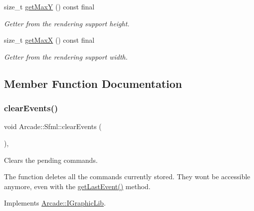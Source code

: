 \begin{DoxyCompactItemize}
size\+\_\+t \hyperlink{class_arcade_1_1_sfml_a90cb12cc852a0198074f55be843d6f99}{get\+MaxY} () const final
\begin{DoxyCompactList}\small\item\em Getter from the rendering support height. \end{DoxyCompactList}\item 
size\+\_\+t \hyperlink{class_arcade_1_1_sfml_a220fc84bb5728f79e36024fded0103ab}{get\+MaxX} () const final
\begin{DoxyCompactList}\small\item\em Getter from the rendering support width. \end{DoxyCompactList}\end{DoxyCompactItemize}


\subsection{Member Function Documentation}
\mbox{\label{class_arcade_1_1_sfml_a882877eba4037ffe3befd61a4b4f1d18}} 
\subsubsection{\texorpdfstring{clear\+Events()}{clearEvents()}}
{\footnotesize\ttfamily void Arcade\+::\+Sfml\+::clear\+Events (\begin{DoxyParamCaption}{ }\end{DoxyParamCaption})\hspace{0.3cm}{\ttfamily [final]}, {\ttfamily [virtual]}}



Clears the pending commands. 

The function deletes all the commands currently stored. They wont be accessible anymore, even with the \hyperlink{class_arcade_1_1_sfml_aa31ab4c4729ee0e3ff030989bc38237b}{get\+Last\+Event()} method. 

Implements \hyperlink{class_arcade_1_1_i_graphic_lib_a78691f8f9433b2af945576231534c1e3}{Arcade\+::\+I\+Graphic\+Lib}.

\mbox{\label{class_arcade_1_1_sfml_a3a2c22328c9ae1cfd7a5af03663e00d0}} 
